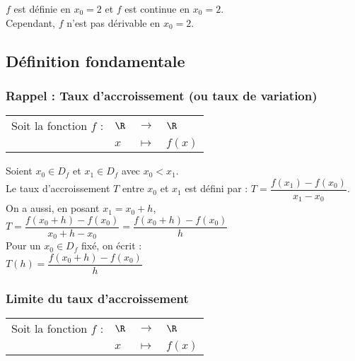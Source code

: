 \vspace*{.3cm}

$f$ est définie en $x_0 = 2$ et $f$ est continue en $x_0 = 2$. \\ Cependant, $f$ n'est pas dérivable en $x_0 = 2$. 

\newpage

\subsection{Définition fondamentale}

\subsubsection{Rappel : Taux d'accroissement (ou taux de variation)}

\begin{tabular}{llll}
Soit la fonction $f$ : & $\R$ & $\longrightarrow$ & $\R$ \\
& $x$ & $\longmapsto$ & $f\left(x\right)$ \\
\end{tabular}

\vspace*{.3cm}

Soient $x_0 \in D_f $ et $x_1 \in D_f$ avec $x_0 < x_1$.  \\

Le taux d'accroissement $T$ entre $x_0$ et $x_1$ est défini par : $T = \dfrac{f(x_1) - f(x_0)}{x_1 - x_0}$. \\

On a aussi, en posant $x_1 = x_0 + h$, \\

$T = \dfrac{f(x_0 + h) - f(x_0)}{x_0 + h - x_0} =\dfrac{f(x_0 + h) - f(x_0)}{h}$ \\

Pour un $x_0 \in D_f$ fixé, on écrit : \\

$T(h) = \dfrac{f(x_0 + h) - f(x_0)}{h}$ 

\subsubsection{Limite du taux d'accroissement}

\begin{tabular}{llll}
Soit la fonction $f$ : & $\R$ & $\longrightarrow$ & $\R$ \\
& $x$ & $\longmapsto$ & $f\left(x\right)$ \\
\end{tabular}

